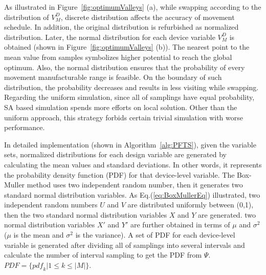   As illustrated in Figure~\ref{fig:optimumValleys} (a), while swapping according to the distribution of $V^D_M$, discrete distribution affects the accuracy of movement schedule. In addition, the original distribution is refurbished as normalized distribution. Later, the normal distribution for each device variable $V^D_M$ is obtained (shown in Figure~\ref{fig:optimumValleys} (b)). The nearest point to the mean value from samples symbolizes higher potential to reach the global optimum. Also, the normal distribution ensures that the probability of every movement manufacturable range is feasible. On the boundary of such distribution, the probability decreases and results in less visiting while swapping. Regarding the uniform simulation, since all of samplings have equal probability, SA based simulation spends more efforts on local solution. Other than the uniform approach, this strategy forbids certain trivial simulation with worse performance.  


  In detailed implementation (shown in Algorithm~\ref{alg:PFTS}), given the variable sets, normalized distributions for each design variable are generated by calculating the mean values and standard deviations. In other words, it represents the probability density function (PDF) for that device-level variable. The Box-Muller method \cite{BoxMuller1958AMS} uses two independent random number, then it generates two standard normal distribution variables. As Eq.(\ref{eq:BoxMullerEq}) illustrated, two independent random numbers $U$ and $V$ are distributed uniformly between (0,1), then the two standard normal distribution variables $X$ and $Y$ are generated. two normal distribution variables $X'$ and $Y'$ are further obtained in terms of $\mu$ and $\sigma^2$ ($\mu$ is the mean and $\sigma^2$ is the variance). A set of PDF for each device-level variable is generated after dividing all of samplings into several intervals and calculate the number of interval sampling to get the PDF from $\Psi$. $PDF = \{ {pdf}_k | 1 \leq k \leq |M|\}$.
    

